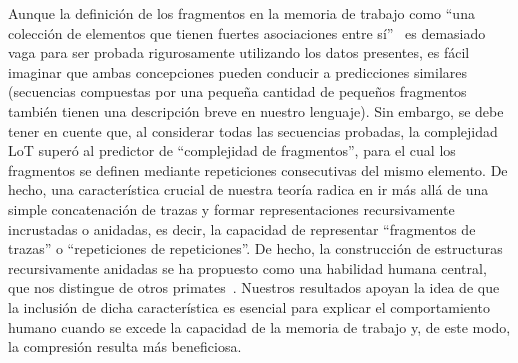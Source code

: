 Aunque la definición de los fragmentos en la memoria de trabajo como ``una colección de elementos que tienen fuertes asociaciones entre sí''~\cite{f25,f110} es demasiado vaga para ser probada rigurosamente utilizando los datos presentes, es fácil imaginar que ambas concepciones pueden conducir a predicciones similares (secuencias compuestas por una pequeña cantidad de pequeños fragmentos también tienen una descripción breve en nuestro lenguaje). Sin embargo, se debe tener en cuente que, al considerar todas las secuencias probadas, la complejidad LoT superó al predictor de ``complejidad de fragmentos'', para el cual los fragmentos se definen mediante repeticiones consecutivas del mismo elemento. De hecho, una característica crucial de nuestra teoría radica en ir más allá de una simple concatenación de trazas y formar representaciones recursivamente incrustadas o anidadas, es decir, la capacidad de representar ``fragmentos de trazas'' o ``repeticiones de repeticiones''. De hecho, la construcción de estructuras recursivamente anidadas se ha propuesto como una habilidad humana central, que nos distingue de otros primates~\cite{f4,f6,f7,f111}. Nuestros resultados apoyan la idea de que la inclusión de dicha característica es esencial para explicar el comportamiento humano cuando se excede la capacidad de la memoria de trabajo y, de este modo, la compresión resulta más beneficiosa.


